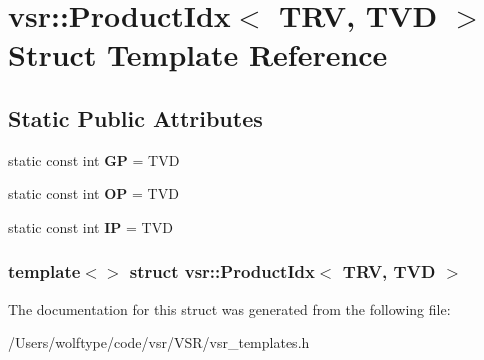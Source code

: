 \hypertarget{structvsr_1_1_product_idx_3_01_t_r_v_00_01_t_v_d_01_4}{\section{vsr\-:\-:Product\-Idx$<$ T\-R\-V, T\-V\-D $>$ Struct Template Reference}
\label{structvsr_1_1_product_idx_3_01_t_r_v_00_01_t_v_d_01_4}
}
\subsection*{Static Public Attributes}
\begin{DoxyCompactItemize}
\item 
\hypertarget{structvsr_1_1_product_idx_3_01_t_r_v_00_01_t_v_d_01_4_a6dc53a50ec9a748317ea0a372de10d03}{static const int {\bfseries G\-P} = T\-V\-D}\label{structvsr_1_1_product_idx_3_01_t_r_v_00_01_t_v_d_01_4_a6dc53a50ec9a748317ea0a372de10d03}

\item 
\hypertarget{structvsr_1_1_product_idx_3_01_t_r_v_00_01_t_v_d_01_4_a6b85fa06ddbd77deb03bc16dfe1c88b6}{static const int {\bfseries O\-P} = T\-V\-D}\label{structvsr_1_1_product_idx_3_01_t_r_v_00_01_t_v_d_01_4_a6b85fa06ddbd77deb03bc16dfe1c88b6}

\item 
\hypertarget{structvsr_1_1_product_idx_3_01_t_r_v_00_01_t_v_d_01_4_ac72e89f0fa603db9789401f1afbb3c45}{static const int {\bfseries I\-P} = T\-V\-D}\label{structvsr_1_1_product_idx_3_01_t_r_v_00_01_t_v_d_01_4_ac72e89f0fa603db9789401f1afbb3c45}

\end{DoxyCompactItemize}
\subsubsection*{template$<$$>$ struct vsr\-::\-Product\-Idx$<$ T\-R\-V, T\-V\-D $>$}



The documentation for this struct was generated from the following file\-:\begin{DoxyCompactItemize}
\item 
/\-Users/wolftype/code/vsr/\-V\-S\-R/vsr\-\_\-templates.\-h\end{DoxyCompactItemize}
